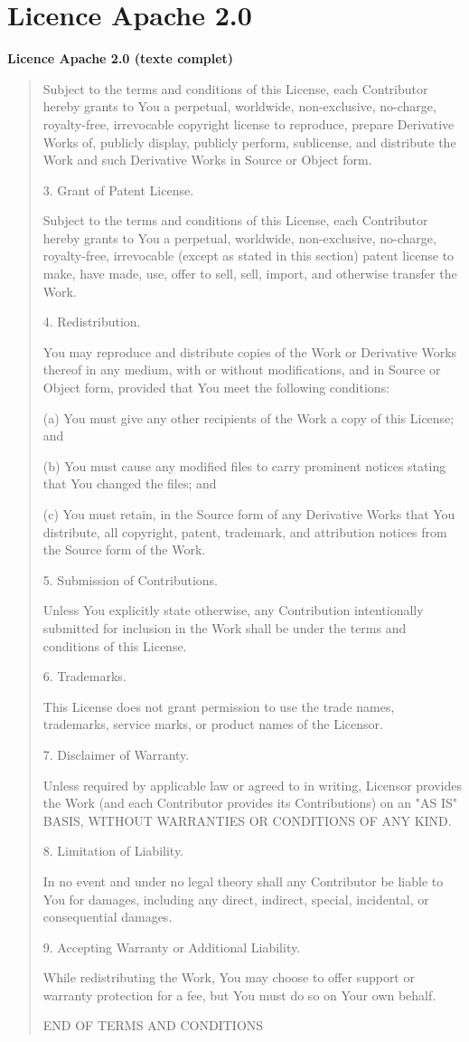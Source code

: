 \documentclass[12pt,a4paper]{article}
\theoremstyle{definition}
\theoremstyle{remark}
\begin{document}
\section{Licence Apache 2.0}
\bigskip
\noindent\textbf{Licence Apache 2.0 (texte complet)}

\begin{quote}
Subject to the terms and conditions of this License, each Contributor
hereby grants to You a perpetual, worldwide, non-exclusive, no-charge,
royalty-free, irrevocable copyright license to reproduce, prepare
Derivative Works of, publicly display, publicly perform, sublicense,
and distribute the Work and such Derivative Works in Source or Object
form.

3. Grant of Patent License.

Subject to the terms and conditions of this License, each Contributor
hereby grants to You a perpetual, worldwide, non-exclusive, no-charge,
royalty-free, irrevocable (except as stated in this section) patent
license to make, have made, use, offer to sell, sell, import, and
otherwise transfer the Work.

4. Redistribution.

You may reproduce and distribute copies of the Work or Derivative
Works thereof in any medium, with or without modifications, and in
Source or Object form, provided that You meet the following conditions:

(a) You must give any other recipients of the Work a copy of this
    License; and

(b) You must cause any modified files to carry prominent notices
    stating that You changed the files; and

(c) You must retain, in the Source form of any Derivative Works that
    You distribute, all copyright, patent, trademark, and attribution
    notices from the Source form of the Work.

5. Submission of Contributions.

Unless You explicitly state otherwise, any Contribution intentionally
submitted for inclusion in the Work shall be under the terms and
conditions of this License.

6. Trademarks.

This License does not grant permission to use the trade names,
trademarks, service marks, or product names of the Licensor.

7. Disclaimer of Warranty.

Unless required by applicable law or agreed to in writing, Licensor
provides the Work (and each Contributor provides its Contributions)
on an "AS IS" BASIS, WITHOUT WARRANTIES OR CONDITIONS OF ANY KIND.

8. Limitation of Liability.

In no event and under no legal theory shall any Contributor be liable
to You for damages, including any direct, indirect, special,
incidental, or consequential damages.

9. Accepting Warranty or Additional Liability.

While redistributing the Work, You may choose to offer support or
warranty protection for a fee, but You must do so on Your own behalf.

END OF TERMS AND CONDITIONS
\end{quote}
\end{document}
